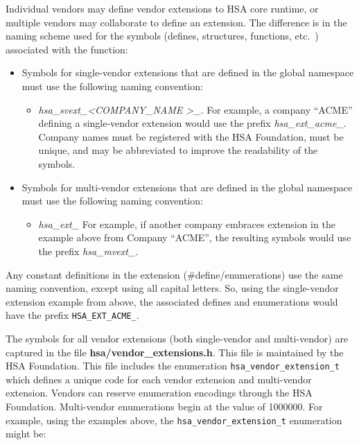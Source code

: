 Individual vendors may define vendor extensions to HSA core runtime,
or multiple vendors may collaborate to define an extension. The
difference is in the naming scheme used for the symbols (defines,
structures, functions, etc.\ ) associated with the function:

\begin{itemize}
\item Symbols for single-vendor extensions that are defined in the
global namespace must use the following naming convention:
  \begin{itemize}
    \item \emph{hsa\_svext\_\textless COMPANY\_NAME \textgreater\_}.
    For example, a company ``ACME'' defining a single-vendor extension
    would use the prefix \emph{hsa\_ext\_acme\_}. Company names must
    be registered with the HSA Foundation, must be unique, and may be
    abbreviated to improve the readability of the symbols.
  \end{itemize}
\item Symbols for multi-vendor extensions that are defined in the
global namespace must use the following naming convention:
  \begin{itemize}
    \item \emph{hsa\_ext\_} For example, if another company
    embraces extension in the example above from Company ``ACME'', the
    resulting symbols would use the prefix \emph{hsa\_mvext\_}.
  \end{itemize}
\end{itemize}

Any constant definitions in the extension (\#define/enumerations) use
the same naming convention, except using all capital letters. So,
using the single-vendor extension example from above, the associated
defines and enumerations would have the prefix
\texttt{HSA\_EXT\_ACME\_}.

The symbols for all vendor extensions (both single-vendor and
multi-vendor) are captured in the file {\bf hsa/vendor\_extensions.h}.
This file is maintained by the HSA Foundation.  This file includes
the enumeration \texttt{hsa\_vendor\_extension\_t} which defines a
unique code for each vendor extension and multi-vendor extension.
Vendors can reserve enumeration encodings through the HSA
Foundation. Multi-vendor enumerations begin at the value of
1000000. For example, using the examples above, the
\texttt{hsa\_vendor\_extension\_t} enumeration might be:



